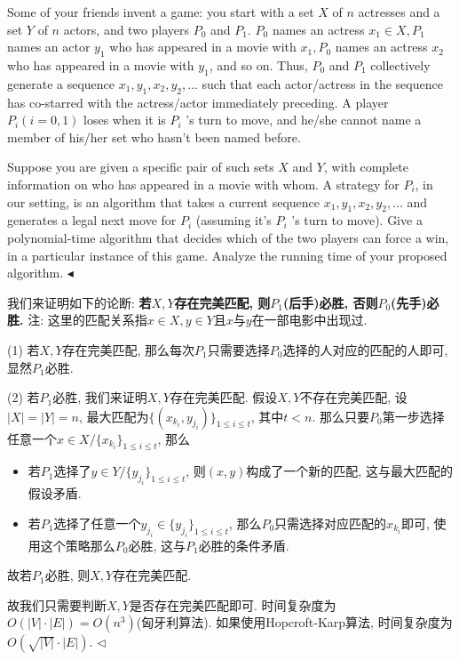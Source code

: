\documentclass[11pt]{article}
\newenvironment{problem}[2][Problem]{\begin{trivlist}
    \item[\hskip \labelsep{\bfseries#1}\hskip\labelsep{\bfseries#2.}]\mbox{}\newline}{\hfill$\blacktriangleleft$\end{trivlist}}
\newenvironment{answer}[1][Answer]{\begin{trivlist}
\item[\hskip \labelsep{\bfseries\itshape#1.}\hskip \labelsep]}{\hfill$\lhd$\end{trivlist}}
\begin{document}
\begin{problem}{4. (Actress/Actor Chain Game)}
    Some of your friends invent a game: you start with a set $X$ of $n$ actresses and a set $Y$ of $n$ actors, and two players $P_{0}$ and $P_{1}$. $P_{0}$ names an actress $x_{1} \in X, P_{1}$ names an actor $y_{1}$ who has appeared in a movie with $x_{1}, P_{0}$ names an actress $x_{2}$ who has appeared in a movie with $y_{1}$, and so on. Thus, $P_{0}$ and $P_{1}$ collectively generate a sequence $x_{1}, y_{1}, x_{2}, y_{2}, \ldots$ such that each actor/actress in the sequence has co-starred with the actress/actor immediately preceding. A player $P_{i}(i=0,1)$ loses when it is $P_{i}$ 's turn to move, and he/she cannot name a member of his/her set who hasn't been named before.

    Suppose you are given a specific pair of such sets $X$ and $Y$, with complete information on who has appeared in a movie with whom. A strategy for $P_{i}$, in our setting, is an algorithm that takes a current sequence $x_{1}, y_{1}, x_{2}, y_{2}, \ldots$ and generates a legal next move for $P_{i}$ (assuming it's $P_{i}$ 's turn to move). Give a polynomial-time algorithm that decides which of the two players can force a win, in a particular instance of this game. Analyze the running time of your proposed algorithm.    
\end{problem}
\begin{answer}
    我们来证明如下的论断: \textbf{若$X,Y$存在完美匹配, 则$P_1$(后手)必胜, 否则$P_0$(先手)必胜.} 注: 这里的匹配关系指$x\in X, y\in Y$且$x$与$y$在一部电影中出现过.

    (1) 若$X,Y$存在完美匹配, 那么每次$P_1$只需要选择$P_0$选择的人对应的匹配的人即可, 显然$P_1$必胜.

    (2) 若$P_1$必胜, 我们来证明$X,Y$存在完美匹配. 假设$X,Y$不存在完美匹配, 设$|X| = |Y| = n$, 最大匹配为$\{(x_{k_i}, y_{j_i})\}_{1\le i\le t}$, 其中$t<n$. 那么只要$P_0$第一步选择任意一个$x\in X/\{x_{k_i}\}_{1\le i \le t}$, 那么
    \begin{itemize}
        \item 若$P_1$选择了$y\in Y/\{y_{j_i}\}_{1\le i \le t}$, 则$(x,y)$构成了一个新的匹配, 这与最大匹配的假设矛盾. 
        \item 若$P_1$选择了任意一个$y_{j_i}\in\{y_{j_i}\}_{1\le i \le t}$, 那么$P_0$只需选择对应匹配的$x_{k_i}$即可, 使用这个策略那么$P_0$必胜, 这与$P_1$必胜的条件矛盾. 
    \end{itemize}
    故若$P_1$必胜, 则$X,Y$存在完美匹配.

故我们只需要判断$X,Y$是否存在完美匹配即可. 时间复杂度为$O(|V|\cdot|E|) = O(n^3)$(匈牙利算法). 如果使用Hopcroft-Karp算法, 时间复杂度为$O(\sqrt{|V|}\cdot|E|) $.
\end{answer}
\end{document}
